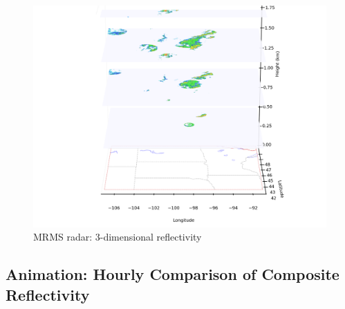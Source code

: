 \documentclass[11pt,fleqn]{report}              %
\begin{document}
\begin{enumerate}
\begin{figure}[ht!]
  \centering
  \includegraphics[width=\linewidth]{fv3_mrms_3dRefl_HRRR_20200618_0600.png}
  \caption{MRMS radar: 3-dimensional reflectivity}
  \label{fig:py_mrms_3d}
\end{figure}


\end{enumerate}



\subsection{Animation: Hourly Comparison of Composite Reflectivity}
\label{subsec:python_ani_refl}
\end{document}
